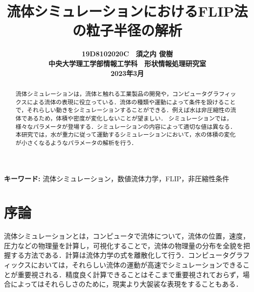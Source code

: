 \documentclass[10pt,a4paper,notitlepage,oneside,twocolumn]{abst_jsarticle}
\title{
{\bf 流体シミュレーションにおけるFLIP法の粒子半径の解析}
}
\author{\begin{center}
{\large {\bf 19D8102020C　須之内 俊樹}}\\
{\large {\bf 中央大学理工学部情報工学科　形状情報処理研究室}}\\
{\large {\bf 2023年3月}}
\end{center}}
\date{}
\begin{document}
\maketitle


\begin{abstract}
流体シミュレーションは，流体と触れる工業製品の開発や，コンピュータグラフィックスによる流体の表現に役立っている．流体の種類や運動によって条件を設けることで，それらしい動きをシミュレーションすることができる．例えば水は非圧縮性の流体であるため，体積や密度が変化しないことが望ましい．
シミュレーションでは，様々なパラメータが登場する．シミュレーションの内容によって適切な値は異なる．本研究では，水が重力に従って運動するシミュレーションにおいて，水の体積の変化が小さくなるようなパラメータの解析を行う．
\end{abstract}

\vspace{1zw} \noindent
{\bf キーワード: }流体シミュレーション，数値流体力学，FLIP，非圧縮性条件

\section{序論} \label{sec:intro}

流体シミュレーションとは，コンピュータで流体について，流体の位置，速度，圧力などの物理量を計算し，可視化することで，流体の物理量の分布を全貌を把握する方法である．計算は流体力学の式を離散化して行う．コンピュータグラフィックスにおいては，それらしい流体の運動が高速でシミュレーションできることが重要視される．精度良く計算できることはそこまで重要視されておらず，場合によってはそれらしさのために，現実より大袈裟な表現をすることもある．
\end{document}
